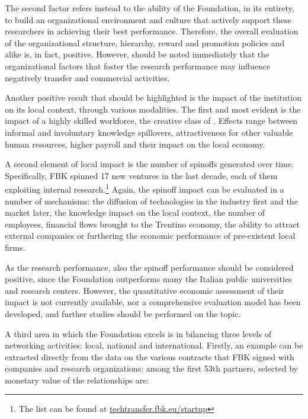 The second factor refers instead to the ability of the Foundation, in its entirety, to build an organizational environment and culture that actively support these researchers in achieving their best performance. Therefore, the overall evaluation of the organizational structure, hierarchy, reward and promotion policies and alike is, in fact, positive. However, should be noted immediately that the organizational factors that foster the research performance may influence negatively transfer and commercial activities.

Another positive result that should be highlighted is the impact of the institution on its local context, through various modalities. The first and most evident is the impact of a highly skilled workforce, the creative class of \citet{Florida2002}. Effects range between informal and involuntary knowledge spillovers, attractiveness for other valuable human resources, higher payroll and their impact on the local economy. 

A second element of local impact is the number of spinoffs generated over time. Specifically, FBK spinned 17 new ventures in the last decade, each of them exploiting internal research.\footnote{The list can be found at \hyperref[https://techtransfer.fbk.eu/startup/]{techtransfer.fbk.eu/startup}}
Again, the spinoff impact can be evaluated in a number of mechanisms: the diffusion of technologies in the industry first and the market later, the knowledge impact on the local context, the number of employees, financial flows brought to the Trentino economy, the ability to attract external companies or furthering the economic performance of pre-existent local firms. 

As the research performance, also the spinoff performance should be considered positive, since the Foundation outperforms many the Italian public universities and research centers. However, the quantitative economic assessment of their impact is not currently available, nor a comprehensive evaluation model has been developed, and further studies should be performed on the topic.

A third area in which the Foundation excels is in bilancing three levels of networking activities: local, national and international. Firstly, an example can be extracted directly from the data on the various contracts that FBK signed with companies and research organizations: among the first 53th partners, selected by monetary value of the relationships are:

